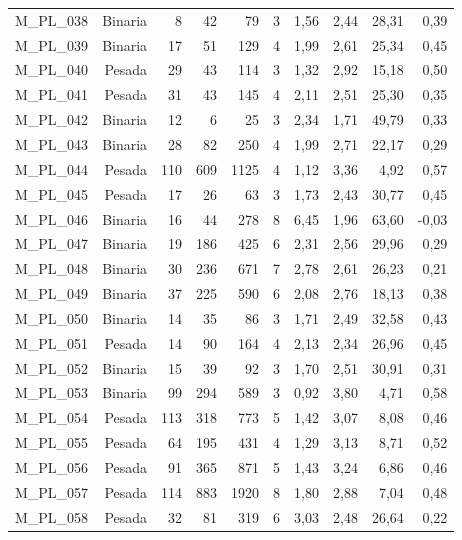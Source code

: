 \begin{table}[ht!]
\begin{tabular}{lrrrrrrrrr}
    M\_PL\_038 & Binaria & 8    & 42   & 79   & 3    & 1,56 & 2,44 & 28,31 & 0,39 \\
    M\_PL\_039 & Binaria & 17   & 51   & 129  & 4    & 1,99 & 2,61 & 25,34 & 0,45 \\
    M\_PL\_040 & Pesada & 29   & 43   & 114  & 3    & 1,32 & 2,92 & 15,18 & 0,50 \\
    M\_PL\_041 & Pesada & 31   & 43   & 145  & 4    & 2,11 & 2,51 & 25,30 & 0,35 \\
    M\_PL\_042 & Binaria & 12   & 6    & 25   & 3    & 2,34 & 1,71 & 49,79 & 0,33 \\
    M\_PL\_043 & Binaria & 28   & 82   & 250  & 4    & 1,99 & 2,71 & 22,17 & 0,29 \\
    M\_PL\_044 & Pesada & 110  & 609  & 1125 & 4    & 1,12 & 3,36 & 4,92 & 0,57 \\
    M\_PL\_045 & Pesada & 17   & 26   & 63   & 3    & 1,73 & 2,43 & 30,77 & 0,45 \\
    M\_PL\_046 & Binaria & 16   & 44   & 278  & 8    & 6,45 & 1,96 & 63,60 & -0,03 \\
    M\_PL\_047 & Binaria & 19   & 186  & 425  & 6    & 2,31 & 2,56 & 29,96 & 0,29 \\
    M\_PL\_048 & Binaria & 30   & 236  & 671  & 7    & 2,78 & 2,61 & 26,23 & 0,21 \\
    M\_PL\_049 & Binaria & 37   & 225  & 590  & 6    & 2,08 & 2,76 & 18,13 & 0,38 \\
    M\_PL\_050 & Binaria & 14   & 35   & 86   & 3    & 1,71 & 2,49 & 32,58 & 0,43 \\
    M\_PL\_051 & Pesada & 14   & 90   & 164  & 4    & 2,13 & 2,34 & 26,96 & 0,45 \\
    M\_PL\_052 & Binaria & 15   & 39   & 92   & 3    & 1,70 & 2,51 & 30,91 & 0,31 \\
    M\_PL\_053 & Binaria & 99   & 294  & 589  & 3    & 0,92 & 3,80 & 4,71 & 0,58 \\
    M\_PL\_054 & Pesada & 113  & 318  & 773  & 5    & 1,42 & 3,07 & 8,08 & 0,46 \\
    M\_PL\_055 & Pesada & 64   & 195  & 431  & 4    & 1,29 & 3,13 & 8,71 & 0,52 \\
    M\_PL\_056 & Pesada & 91   & 365  & 871  & 5    & 1,43 & 3,24 & 6,86 & 0,46 \\
    M\_PL\_057 & Pesada & 114  & 883  & 1920 & 8    & 1,80 & 2,88 & 7,04 & 0,48 \\
    M\_PL\_058 & Pesada & 32   & 81   & 319  & 6    & 3,03 & 2,48 & 26,64 & 0,22 \\

\end{tabular}
\end{table}
